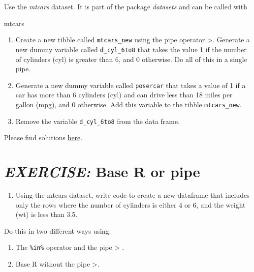 \documentclass[
  12pt,
  oneside]{book}
\newenvironment{Shaded}{\begin{snugshade}}{\end{snugshade}}
\newcommand{\NormalTok}[1]{#1}
\providecommand{\tightlist}{%
  \setlength{\itemsep}{0pt}\setlength{\parskip}{0pt}}
\begin{document}
Use the \emph{mtcars} dataset. It is part of the package \emph{datasets} and can be called with

\begin{Shaded}
\begin{Highlighting}[]
\NormalTok{mtcars}
\end{Highlighting}
\end{Shaded}

\begin{enumerate}
\def\labelenumi{\alph{enumi})}
\item
  Create a new tibble called \texttt{mtcars\_new} using the pipe operator \textbar\textgreater. Generate a new dummy variable called \texttt{d\_cyl\_6to8} that takes the value 1 if the number of cylinders (cyl) is greater than 6, and 0 otherwise. Do all of this in a single pipe.
\item
  Generate a new dummy variable called \texttt{posercar} that takes a value of 1 if a car has more than 6 cylinders (cyl) and can drive less than 18 miles per gallon (mpg), and 0 otherwise. Add this variable to the tibble \texttt{mtcars\_new}.
\item
  Remove the variable \texttt{d\_cyl\_6to8} from the data frame.
\end{enumerate}

Please find solutions \href{https://raw.githubusercontent.com/hubchev/courses/main/scr/exe_genanddrop.R}{here}.

\hypertarget{exercise-base-r-or-pipe}{%
\section*{\texorpdfstring{\emph{EXERCISE:} Base R or pipe}{EXERCISE: Base R or pipe}}\label{exercise-base-r-or-pipe}}

\begin{enumerate}
\def\labelenumi{\alph{enumi})}
\tightlist
\item
  Using the mtcars dataset, write code to create a new dataframe that includes only the rows where the number of cylinders is either 4 or 6, and the weight (wt) is less than 3.5.
\end{enumerate}

Do this in two different ways using:

\begin{enumerate}
\def\labelenumi{\arabic{enumi}.}
\tightlist
\item
  The \texttt{\%in\%} operator and the pipe \textbar\textgreater{} .
\item
  Base R without the pipe \textbar\textgreater.
\end{enumerate}
\end{document}
